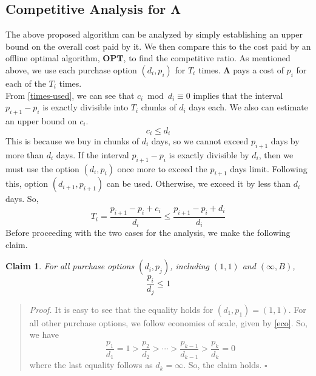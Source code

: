 \documentclass[11pt]{article}
\newtheorem{claim}{Claim}
\begin{document}
\subsection*{Competitive Analysis for $\mathbf{\Lambda}$}
The above proposed algorithm can be analyzed by simply establishing an upper bound on the overall cost paid by it. We then compare this
to the cost paid by an offline optimal algorithm, $\mathbf{OPT}$, to find the competitive ratio. As mentioned above, we use each
purchase option $(d_{i}, p_{i})$ for $T_{i}$ times. $\mathbf{\Lambda}$ pays a cost of $p_{i}$ for each of the $T_{i}$ times. \\
From \eqref{times-used}, we can see that $c_{i} \bmod d_{i} \equiv 0$ implies that the interval $p_{i+1} - p_{i}$ is exactly divisible into
$T_{i}$ chunks of $d_{i}$ days each. We also can estimate an upper bound on $c_{i}$.
\begin{equation}
    c_{i} \leq d_{i}
\end{equation}
This is because we buy in chunks of $d_{i}$ days, so we cannot exceed $p_{i+1}$ days by more than $d_{i}$ days. If the interval
$p_{i+1} - p_{i}$ is exactly divisible by $d_{i}$, then we must use the option $(d_{i}, p_{i})$ once more to exceed the $p_{i+1}$ days
limit. Following this, option $(d_{i+1}, p_{i+1})$ can be used. Otherwise, we exceed it by less than $d_{i}$ days. So,
\begin{equation}
    \label{times-used-2}
    T_{i} = \frac{p_{i+1} - p_{i} + c_{i}}{d_{i}} \leq \frac{p_{i+1} - p_{i} + d_{i}}{d_{i}}
\end{equation}
Before proceeding with the two cases for the analysis, we make the following claim.
\begin{claim}
    \label{claim:pi-di}
    For all purchase options $(d_{i}, p_{j})$, including $(1, 1)$ and $(\infty, B)$,
    $$\frac{p_{i}}{d_{j}} \leq 1$$
\end{claim}
\begin{quote}
    \textit{Proof.} It is easy to see that the equality holds for $(d_{1}, p_{1}) = (1, 1)$. For all other purchase options, we follow
    economies of scale, given by \eqref{eco}. So, we have
    \begin{equation}
        \frac{p_{1}}{d_{1}} = 1 > \frac{p_{2}}{d_{2}} > \cdots > \frac{p_{k-1}}{d_{k-1}} > \frac{p_{k}}{d_{k}} = 0
    \end{equation}
    where the last equality follows as $d_{k} = \infty$. So, the claim holds.
    \hfill $\square$
\end{quote}
\end{document}

